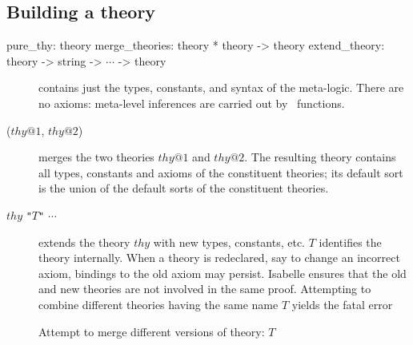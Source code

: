 %
%

\subsection{Building a theory}
\label{BuildingATheory}
\begin{ttbox} 
pure_thy: theory
merge_theories: theory * theory -> theory
extend_theory: theory -> string -> \(\cdots\) -> theory
\end{ttbox}
\begin{description}
\item[] contains just the types, constants, and syntax
  of the meta-logic.  There are no axioms: meta-level inferences are carried
  out by \ML\ functions.
\item[ ($thy@1$, $thy@2$)] merges the two
  theories $thy@1$ and $thy@2$.  The resulting theory contains all types,
  constants and axioms of the constituent theories; its default sort is the
  union of the default sorts of the constituent theories.
\item [ $thy$ {\tt"}$T${\tt"} $\cdots$] extends
  the theory $thy$ with new types, constants, etc.  $T$ identifies the theory
  internally.  When a theory is redeclared, say to change an incorrect axiom,
  bindings to the old axiom may persist.  Isabelle ensures that the old and
  new theories are not involved in the same proof.  Attempting to combine
  different theories having the same name $T$ yields the fatal error
\begin{ttbox}
Attempt to merge different versions of theory: \(T\)
\end{ttbox}
\end{description}


